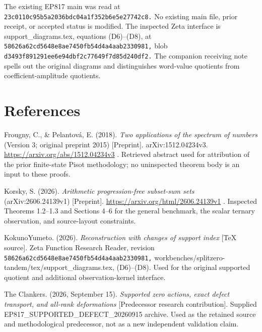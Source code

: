 The existing EP817 main was read at \nolinkurl{23c0110c95b5a2036bdc04a1f352b6e5e27742c8.} No existing main file, prior receipt, or accepted status is modified. The inspected Zeta interface is support\_diagrams.tex, equations (D6)--(D8), at \nolinkurl{58626a62cd5648e8ae7450fb54d4a4aab2330981,} blob \nolinkurl{d3493f891291ee6e94dbf2c77649f7d85d240df2.} The companion receiving note spells out the original diagrams and distinguishes word-value quotients from coefficient-amplitude quotients.

\section{References}\label{n14-references}

Frougny, C., \& Pelantová, E. (2018). \emph{Two applications of the spectrum of numbers} (Version 3; original preprint 2015) {[}Preprint{]}. arXiv:1512.04234v3. \url{https://arxiv.org/abs/1512.04234v3} . Retrieved abstract used for attribution of the prior finite-state Pisot methodology; no uninspected theorem body is an input to these proofs.

Korsky, S. (2026). \emph{Arithmetic progression-free subset-sum sets} (arXiv:2606.24139v1) {[}Preprint{]}. \url{https://arxiv.org/html/2606.24139v1} . Inspected Theorems 1.2--1.3 and Sections 4--6 for the general benchmark, the scalar ternary observation, and source-layout constraints.

KokunoYumeto. (2026). \emph{Reconstruction with changes of support index} {[}TeX source{]}. Zeta Function Research Reader, revision \nolinkurl{58626a62cd5648e8ae7450fb54d4a4aab2330981,} workbenches/splitzero-tandem/tex/support\_diagrams.tex, (D6)--(D8). Used for the original supported quotient and additional observation-kernel interface.

The Clankers. (2026, September 15). \emph{Supported zero actions, exact defect transport, and all-rank deformations} {[}Predecessor research contribution{]}. Supplied EP817\_SUPPORTED\_DEFECT\_20260915 archive. Used as the retained source and methodological predecessor, not as a new independent validation claim.
